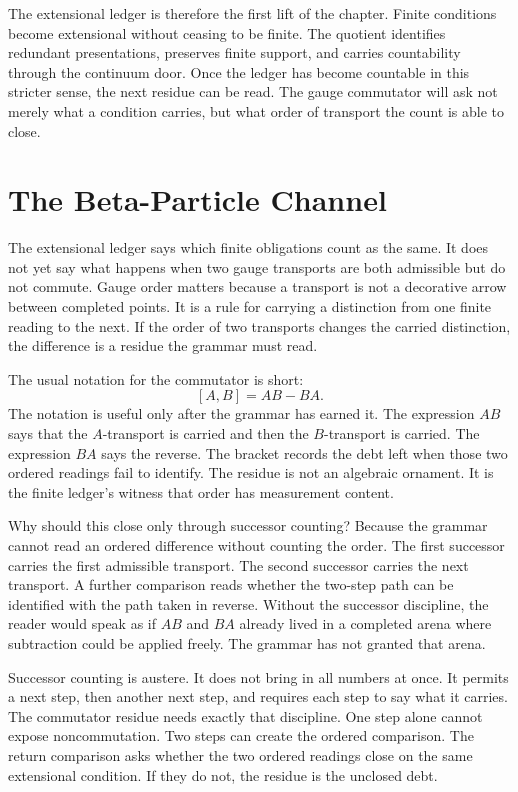 The extensional ledger is therefore the first lift of the chapter. Finite
conditions become extensional without ceasing to be finite. The quotient
identifies redundant presentations, preserves finite support, and carries
countability through the continuum door. Once the ledger has become
countable in this stricter sense, the next residue can be read. The gauge
commutator will ask not merely what a condition carries, but what order of
transport the count is able to close.

\section{The Beta-Particle Channel}

The extensional ledger says which finite obligations count as the same. It
does not yet say what happens when two gauge transports are both admissible
but do not commute. Gauge order matters because a transport is not a decorative
arrow between completed points. It is a rule for carrying a distinction from
one finite reading to the next. If the order of two transports changes the
carried distinction, the difference is a residue the grammar must read.

The usual notation for the commutator is short:
\[
  [A,B] = AB - BA .
\]
The notation is useful only after the grammar has earned it. The expression
\(AB\) says that the \(A\)-transport is carried and then the \(B\)-transport
is carried. The expression \(BA\) says the reverse. The bracket records the
debt left when those two ordered readings fail to identify. The residue is
not an algebraic ornament. It is the finite ledger's witness that order has
measurement content.

Why should this close only through successor counting? Because the grammar
cannot read an ordered difference without counting the order. The first
successor carries the first admissible transport. The second successor
carries the next transport. A further comparison reads whether the two-step
path can be identified with the path taken in reverse. Without the successor
discipline, the reader would speak as if \(AB\) and \(BA\) already lived in a
completed arena where subtraction could be applied freely. The grammar has
not granted that arena.

Successor counting is austere. It does not bring in all numbers at once. It
permits a next step, then another next step, and requires each step to say
what it carries. The commutator residue needs exactly that discipline. One
step alone cannot expose noncommutation. Two steps can create the ordered
comparison. The return comparison asks whether the two ordered readings close
on the same extensional condition. If they do not, the residue is the
unclosed debt.


